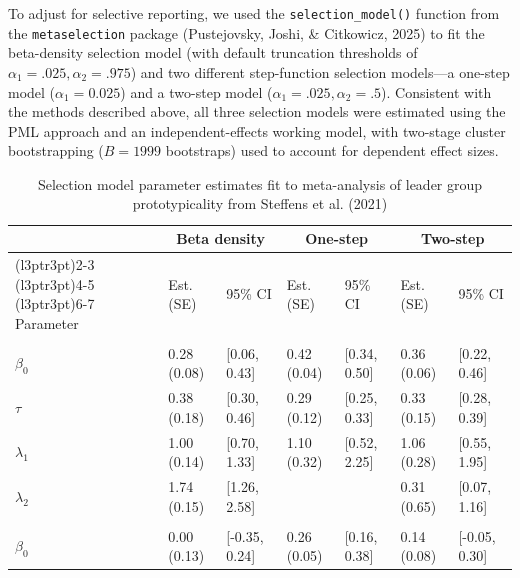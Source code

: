 \documentclass[
  american,
  man, donotrepeattitle,floatsintext]{apa7}
\begin{document}
To adjust for selective reporting, we used the \texttt{selection\_model()} function from the \texttt{metaselection} package (Pustejovsky, Joshi, \& Citkowicz, 2025) to fit the beta-density selection model (with default truncation thresholds of \(\alpha_1 = .025, \alpha_2 = .975\)) and two different step-function selection models---a one-step model (\(\alpha_1 = 0.025\)) and a two-step model (\(\alpha_1 = .025, \alpha_2 = .5\)). Consistent with the methods described above, all three selection models were estimated using the PML approach and an independent-effects working model, with two-stage cluster bootstrapping (\(B = 1999\) bootstraps) used to account for dependent effect sizes.

\begin{table}
\centering
\caption{\label{tab:social-identity-theory-res}Selection model parameter estimates fit to meta-analysis of leader group prototypicality from Steffens et al. (2021)}
\centering
\begin{tabular}[t]{lllllll}
\toprule
\multicolumn{1}{c}{ } & \multicolumn{2}{c}{Beta density} & \multicolumn{2}{c}{One-step} & \multicolumn{2}{c}{Two-step} \\
\cmidrule(l{3pt}r{3pt}){2-3} \cmidrule(l{3pt}r{3pt}){4-5} \cmidrule(l{3pt}r{3pt}){6-7}
Parameter & Est. (SE) & 95\% CI & Est. (SE) & 95\% CI & Est. (SE) & 95\% CI\\
\midrule
\addlinespace[0.3em]
\multicolumn{7}{l}{\textbf{Summary meta-analysis}}\\
\hspace{1em}$\beta_0$ & 0.28 (0.08) & {}[0.06, 0.43] & 0.42 (0.04) & {}[0.34, 0.50] & 0.36 (0.06) & {}[0.22, 0.46]\\
\hspace{1em}$\tau$ & 0.38 (0.18) & {}[0.30, 0.46] & 0.29 (0.12) & {}[0.25, 0.33] & 0.33 (0.15) & {}[0.28, 0.39]\\
\hspace{1em}$\lambda_1$ & 1.00 (0.14) & {}[0.70, 1.33] & 1.10 (0.32) & {}[0.52, 2.25] & 1.06 (0.28) & {}[0.55, 1.95]\\
\hspace{1em}$\lambda_2$ & 1.74 (0.15) & {}[1.26, 2.58] &  &  & 0.31 (0.65) & {}[0.07, 1.16]\\
\addlinespace[0.3em]
\multicolumn{7}{l}{\textbf{Moderator analysis}}\\
\hspace{1em}$\beta_0$ & 0.00 (0.13) & {}[-0.35, 0.24] & 0.26 (0.05) & {}[0.16, 0.38] & 0.14 (0.08) & {}[-0.05, 0.30]\\

\end{tabular}
\end{table}
\end{document}
